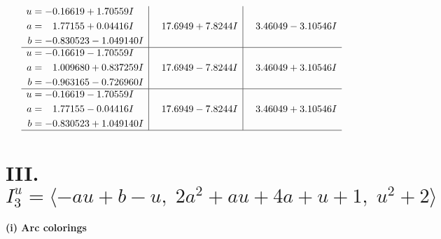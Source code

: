 \documentclass[1p]{elsarticle_modified}
\theoremstyle{definition}
\begin{document}
$$\begin{array}{c|c|c}
\begin{aligned}
u &= -0.16619 + 1.70559 I \\
a &= \phantom{-}1.77155 + 0.04416 I \\
b &= -0.830523 - 1.049140 I\end{aligned}
 & \phantom{-}17.6949 + 7.8244 I & \phantom{-}3.46049 - 3.10546 I \\ \hline\begin{aligned}
u &= -0.16619 - 1.70559 I \\
a &= \phantom{-}1.009680 + 0.837259 I \\
b &= -0.963165 - 0.726960 I\end{aligned}
 & \phantom{-}17.6949 - 7.8244 I & \phantom{-}3.46049 + 3.10546 I \\ \hline\begin{aligned}
u &= -0.16619 - 1.70559 I \\
a &= \phantom{-}1.77155 - 0.04416 I \\
b &= -0.830523 + 1.049140 I\end{aligned}
 & \phantom{-}17.6949 - 7.8244 I & \phantom{-}3.46049 + 3.10546 I\\
 \hline 
 \end{array}$$\newpage\newpage\renewcommand{\arraystretch}{1}
\centering \section*{III. $I^u_{3}= \langle - a u+b- u,\;2 a^2+a u+4 a+u+1,\;u^2+2 \rangle$}
\flushleft \textbf{(i) Arc colorings}\\
\end{document}
